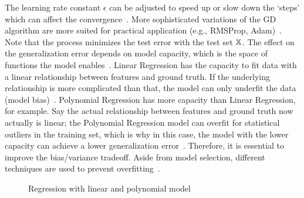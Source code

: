 The learning rate constant $\epsilon$ can be adjusted to speed up or slow down the `steps' which
can affect the convergence~\citep{goodfellow_deep_2016}.
More sophisticated variations of the \ac{GD} algorithm are more suited for practical
application (e.g., RMSProp, Adam)~\citep{geron_hands-machine_2017}.
Note that the process minimizes the test error with the test set $\mathbb{X}$.
The effect on the generalization error depends on model capacity, which is the space of functions
the model enables~\citep{goodfellow_deep_2016}.
Linear Regression has the capacity to fit data with a linear relationship between features and
ground truth.
If the underlying relationship is more complicated than that, the model can only underfit the data
(model bias)~\citep{goodfellow_deep_2016}.
Polynomial Regression has more capacity than Linear Regression, for example.
Say the actual relationship between features and ground truth now actually is linear;
the Polynomial Regression model can overfit for statistical outliers in the training set, which is why
in this case, the model with the lower capacity can achieve a lower generalization
error~\citep{geron_hands-machine_2017}.
Therefore, it is essential to improve the bias/variance tradeoff.
Aside from model selection, different techniques are used to prevent
overfitting~\citep{goodfellow_deep_2016}.
\begin{figure}[h]
    \centering
    \caption[Regression over- and underfitting]{%
        Regression with linear and polynomial model\label{fig:examples}
    }
\end{figure}

